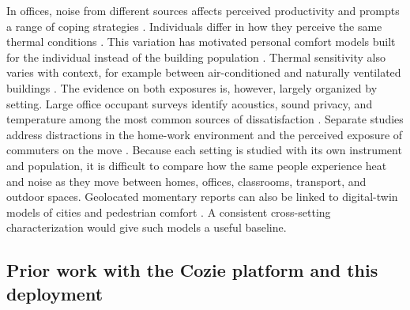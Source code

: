 \documentclass[]{interact}
\begin{document}
In offices, noise from different sources affects perceived productivity and prompts a range of coping strategies \citep{Appel-Meulenbroek2020-bp}.
Individuals differ in how they perceive the same thermal conditions \citep{Wang2018-aj}.
This variation has motivated personal comfort models built for the individual instead of the building population \citep{Arakawa_Martins2022-vh}.
Thermal sensitivity also varies with context, for example between air-conditioned and naturally ventilated buildings \citep{Rupp2022-lq}.
The evidence on both exposures is, however, largely organized by setting.
Large office occupant surveys identify acoustics, sound privacy, and temperature among the most common sources of dissatisfaction \citep{Graham2021-en,Parkinson2023-yk}.
Separate studies address distractions in the home-work environment \citep{Bergefurt2023-fm} and the perceived exposure of commuters on the move \citep{Marquart2022-rt}.
Because each setting is studied with its own instrument and population, it is difficult to compare how the same people experience heat and noise as they move between homes, offices, classrooms, transport, and outdoor spaces.
Geolocated momentary reports can also be linked to digital-twin models of cities and pedestrian comfort \citep{Ignatius2024-ii}.
A consistent cross-setting characterization would give such models a useful baseline.

\subsection{Prior work with the Cozie platform and this deployment}\label{sec:rw-prior-cozie}
\end{document}
